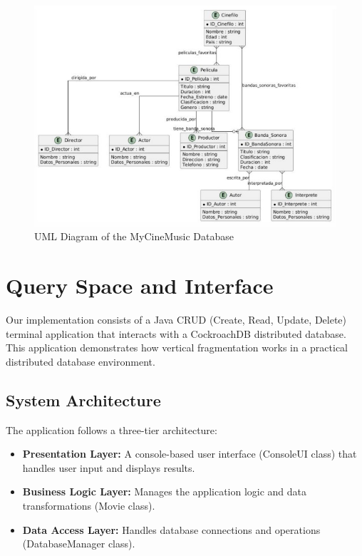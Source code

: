 \documentclass[twoside]{article}
\begin{document}
\begin{figure}[H]
  \centering
  \includegraphics[width=1\textwidth]{imgs/uml.jpeg}
  \caption{UML Diagram of the MyCineMusic Database}
  \label{fig:2}
\end{figure}

\section{Query Space and Interface}

Our implementation consists of a Java CRUD (Create, Read, Update, Delete) terminal application that interacts with a CockroachDB distributed database. This application demonstrates how vertical fragmentation works in a practical distributed database environment.

\subsection{System Architecture}

The application follows a three-tier architecture:

\begin{itemize}
  \item \textbf{Presentation Layer:} A console-based user interface (ConsoleUI class) that handles user input and displays results.
  \item \textbf{Business Logic Layer:} Manages the application logic and data transformations (Movie class).
  \item \textbf{Data Access Layer:} Handles database connections and operations (DatabaseManager class).
\end{itemize}
\end{document}
